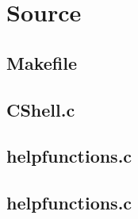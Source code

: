 \chapter{Source}
\section{Makefile}


\section{CShell.c}


\section{helpfunctions.c}


\section{helpfunctions.c}
